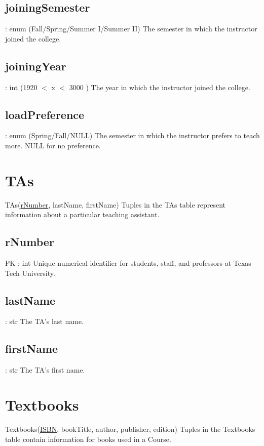     \subsection{joiningSemester}
    	: enum (Fall/Spring/Summer I/Summer II) 
    	The semester in which the instructor joined the college.
    
    \subsection{joiningYear}
    	: int (1920 $<$ x $<$ 3000 )
    	The year in which the instructor joined the college.
    
    \subsection{loadPreference}
    	: enum (Spring/Fall/NULL)
    	The semester in which the instructor prefers to teach more. NULL for no preference.
    	
    
\section{TAs}
	TAs(\underline{rNumber}, lastName, firstName)
		Tuples in the TAs table represent information about a particular teaching assistant.

	\subsection{rNumber}
		PK : int 
		Unique numerical identifier for students, staff, and professors at Texas Tech University.
		
	\subsection{lastName}
		: str  
    	The TA's last name.
    
    \subsection{firstName}
    	: str 
    	The TA's first name.
	
\section{Textbooks}
	Textbooks(\underline{ISBN}, bookTitle, author, publisher, edition) 
		Tuples in the Textbooks table contain information for books used in a Course.

